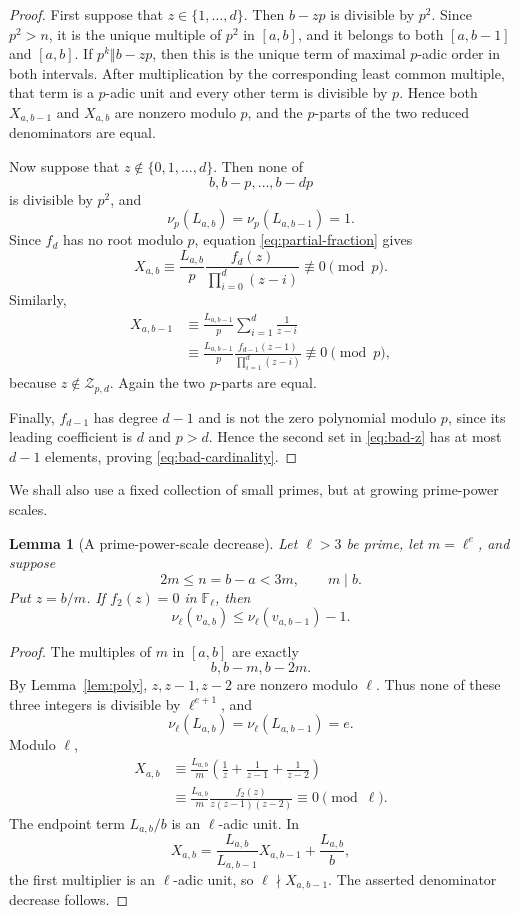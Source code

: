 \documentclass[11pt]{article}
\newtheorem{lemma}[theorem]{Lemma}
\newcommand{\F}{\mathbb F}
\begin{document}
\begin{proof}
First suppose that $z\in\{1,\ldots,d\}$. Then $b-zp$ is divisible by $p^2$. Since $p^2>n$, it is the unique multiple of $p^2$ in $[a,b]$, and it belongs to both $[a,b-1]$ and $[a,b]$. If $p^k\Vert b-zp$, then this is the unique term of maximal $p$-adic order in both intervals. After multiplication by the corresponding least common multiple, that term is a $p$-adic unit and every other term is divisible by $p$. Hence both $X_{a,b-1}$ and $X_{a,b}$ are nonzero modulo $p$, and the $p$-parts of the two reduced denominators are equal.

Now suppose that $z\notin\{0,1,\ldots,d\}$. Then none of
\[
  b,b-p,\ldots,b-dp
\]
is divisible by $p^2$, and
\[
  \nu_p(L_{a,b})=\nu_p(L_{a,b-1})=1.
\]
Since $f_d$ has no root modulo $p$, equation \eqref{eq:partial-fraction} gives
\[
  X_{a,b}
  \equiv \frac{L_{a,b}}p
      \frac{f_d(z)}{\prod_{i=0}^{d}(z-i)}
  \not\equiv0\pmod p.
\]
Similarly,
\[
\begin{aligned}
  X_{a,b-1}
  &\equiv \frac{L_{a,b-1}}p\sum_{i=1}^{d}\frac1{z-i}\\
  &\equiv \frac{L_{a,b-1}}p
      \frac{f_{d-1}(z-1)}{\prod_{i=1}^{d}(z-i)}
  \not\equiv0\pmod p,
\end{aligned}
\]
because $z\notin\mathcal Z_{p,d}$. Again the two $p$-parts are equal.

Finally, $f_{d-1}$ has degree $d-1$ and is not the zero polynomial modulo $p$, since its leading coefficient is $d$ and $p>d$. Hence the second set in \eqref{eq:bad-z} has at most $d-1$ elements, proving \eqref{eq:bad-cardinality}.
\end{proof}

We shall also use a fixed collection of small primes, but at growing prime-power scales.

\begin{lemma}[A prime-power-scale decrease]\label{lem:power-local}
Let $\ell>3$ be prime, let $m=\ell^e$, and suppose
\[
  2m\leq n=b-a<3m,
  \qquad m\mid b.
\]
Put $z=b/m$. If $f_2(z)=0$ in $\F_\ell$, then
\[
  \nu_\ell(v_{a,b})\leq \nu_\ell(v_{a,b-1})-1.
\]
\end{lemma}

\begin{proof}
The multiples of $m$ in $[a,b]$ are exactly
\[
  b,b-m,b-2m.
\]
By Lemma~\ref{lem:poly}, $z,z-1,z-2$ are nonzero modulo $\ell$. Thus none of these three integers is divisible by $\ell^{e+1}$, and
\[
  \nu_\ell(L_{a,b})=\nu_\ell(L_{a,b-1})=e.
\]
Modulo $\ell$,
\[
\begin{aligned}
  X_{a,b}
  &\equiv \frac{L_{a,b}}m
      \left(\frac1z+\frac1{z-1}+\frac1{z-2}\right)\\
  &\equiv \frac{L_{a,b}}m
      \frac{f_2(z)}{z(z-1)(z-2)}
  \equiv0\pmod\ell.
\end{aligned}
\]
The endpoint term $L_{a,b}/b$ is an $\ell$-adic unit. In
\[
  X_{a,b}
  =\frac{L_{a,b}}{L_{a,b-1}}X_{a,b-1}+\frac{L_{a,b}}b,
\]
the first multiplier is an $\ell$-adic unit, so $\ell\nmid X_{a,b-1}$. The asserted denominator decrease follows.
\end{proof}
\end{document}
